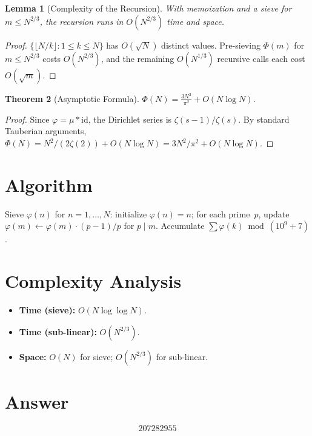 \documentclass[11pt]{article}
\newtheorem{theorem}{Theorem}
\newtheorem{lemma}[theorem]{Lemma}
\theoremstyle{definition}
\begin{document}
\begin{lemma}[Complexity of the Recursion]
With memoization and a sieve for $m \leq N^{2/3}$, the recursion runs in $O(N^{2/3})$ time and space.
\end{lemma}

\begin{proof}
$\{\lfloor N/k\rfloor : 1 \leq k \leq N\}$ has $O(\sqrt{N})$ distinct values. Pre-sieving $\Phi(m)$ for $m \leq N^{2/3}$ costs $O(N^{2/3})$, and the remaining $O(N^{1/3})$ recursive calls each cost $O(\sqrt{m})$.
\end{proof}

\begin{theorem}[Asymptotic Formula]
$\Phi(N) = \frac{3N^2}{\pi^2} + O(N\log N)$.
\end{theorem}

\begin{proof}
Since $\varphi = \mu * \mathrm{id}$, the Dirichlet series is $\zeta(s{-}1)/\zeta(s)$. By standard Tauberian arguments, $\Phi(N) = N^2/(2\zeta(2)) + O(N\log N) = 3N^2/\pi^2 + O(N\log N)$.
\end{proof}

\section{Algorithm}

Sieve $\varphi(n)$ for $n = 1,\ldots,N$: initialize $\varphi(n) = n$; for each prime~$p$, update $\varphi(m) \gets \varphi(m)\cdot(p{-}1)/p$ for $p \mid m$. Accumulate $\sum\varphi(k) \bmod (10^9{+}7)$.

\section{Complexity Analysis}

\begin{itemize}
    \item \textbf{Time (sieve):} $O(N\log\log N)$.
    \item \textbf{Time (sub-linear):} $O(N^{2/3})$.
    \item \textbf{Space:} $O(N)$ for sieve; $O(N^{2/3})$ for sub-linear.
\end{itemize}

\section{Answer}

\[
\boxed{207282955}
\]
\end{document}
